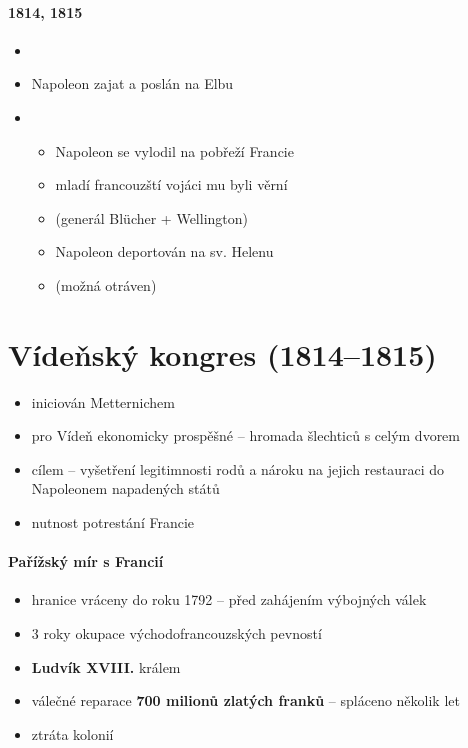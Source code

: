 \paragraph{1814, 1815}
\begin{itemize}
\item {}
\item Napoleon zajat a poslán na Elbu
\item {}
	\begin{itemize}
	\item Napoleon se vylodil na pobřeží Francie
	\item mladí francouzští vojáci mu byli věrní
	\item {}  (generál Blücher + Wellington)
	\item Napoleon deportován na sv. Helenu
	\item {} (možná otráven)
	\end{itemize}
\end{itemize}



\section{Vídeňský kongres (1814--1815)}
\begin{itemize}
\item iniciován Metternichem
\item pro Vídeň ekonomicky prospěšné -- hromada šlechticů s celým dvorem
\item cílem -- vyšetření legitimnosti rodů a nároku na jejich restauraci do Napoleonem napadených států
\item nutnost potrestání Francie
\end{itemize}

\paragraph{Pařížský mír s Francií}
	\begin{itemize}
	\item hranice vráceny do roku 1792 -- před zahájením výbojných válek
	\item 3 roky okupace východofrancouzských pevností
	\item \textbf{Ludvík XVIII.} králem
	\item válečné reparace \textbf{700 milionů zlatých franků} -- spláceno několik let
	\item ztráta kolonií
	\end{itemize}
	
